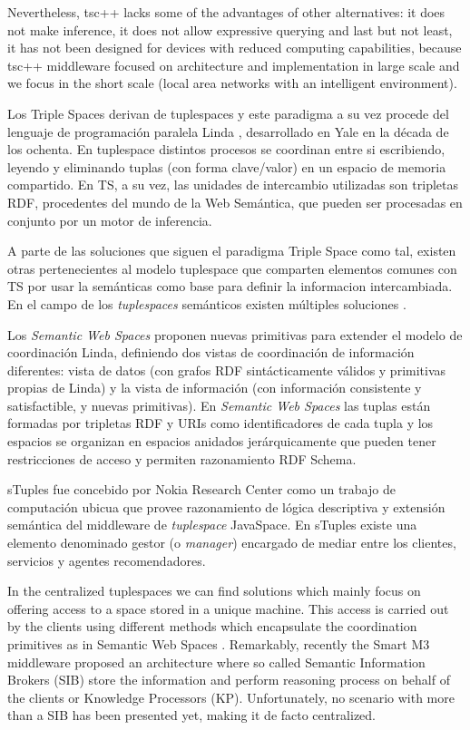 Nevertheless, tsc++ lacks some of the advantages of other alternatives: it does not make inference, it does not allow expressive querying
and last but not least, it has not been designed for devices with reduced computing capabilities, because tsc++ middleware focused on
architecture and implementation in large scale and we focus in the short scale (local area networks with an intelligent environment).

Los Triple Spaces derivan de tuplespaces y este paradigma a su vez procede del lenguaje de programación paralela Linda \cite{gelernter_generative_1985}, desarrollado en Yale en la década de los ochenta. En tuplespace distintos procesos se coordinan entre si escribiendo, leyendo y eliminando tuplas (con forma clave/valor) en un espacio de memoria compartido. En TS, a su vez, las unidades de intercambio utilizadas son tripletas RDF, procedentes del mundo de la Web Semántica, que pueden ser procesadas en conjunto por un motor de inferencia.

A parte de las soluciones que siguen el paradigma Triple Space como tal, existen otras pertenecientes al modelo tuplespace que comparten elementos comunes con TS por usar la semánticas como base para definir la informacion intercambiada. En el campo de los \textit{tuplespaces} semánticos existen múltiples soluciones \cite{nixon_tuplespace-based_2008}.

Los \textit{Semantic Web Spaces} \cite{tolksdorf_coordination_2006,tolksdorf_towards_2008} proponen nuevas primitivas para extender el modelo de coordinación Linda, definiendo dos vistas de coordinación de información diferentes: vista de datos (con grafos RDF sintácticamente válidos y primitivas propias de Linda) y la vista de información (con información consistente y satisfactible, y nuevas primitivas). En \textit{Semantic Web Spaces} las tuplas están formadas por tripletas RDF y URIs como identificadores de cada tupla y los espacios se organizan en espacios anidados jerárquicamente que pueden tener restricciones de acceso y permiten razonamiento RDF Schema.

sTuples \cite{khushraj_stuples:_2004} fue concebido por Nokia Research Center como un trabajo de computación ubicua que provee razonamiento de lógica descriptiva y extensión semántica del middleware de \textit{tuplespace} JavaSpace. En sTuples existe una elemento denominado gestor (o \textit{manager}) encargado de mediar entre los clientes, servicios y agentes recomendadores.


In the centralized tuplespaces we can find solutions which mainly focus on offering access to a space stored in a unique
machine. This access is carried out by the clients using different methods which encapsulate the coordination primitives
as in Semantic Web Spaces \cite{nixon_towards_2007}. Remarkably, recently the Smart M3 middleware proposed an
architecture where so called Semantic Information Brokers (SIB) store the information and perform reasoning
process on behalf of the clients or Knowledge Processors (KP). Unfortunately, no scenario with more than a SIB has been
presented yet, making it de facto centralized.


